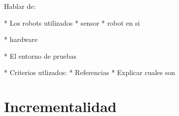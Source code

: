 Hablar de:

* Los robots utilizados
  * sensor 
  * robot en si

* hardware

* El entorno de pruebas

* Criterios utlizados:
  * Referencias
  * Explicar cuales son

\section{Incrementalidad}

